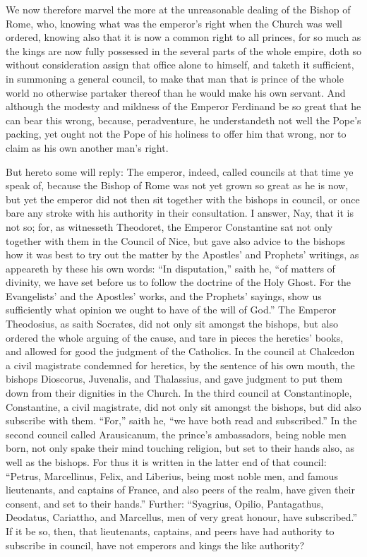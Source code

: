 We now therefore marvel the more at the unreasonable dealing of the
Bishop of Rome, who, knowing what was the emperor’s right when
the Church was well ordered, knowing also that it is now a common right
to all princes, for so much as the kings are now fully possessed in
the several parts of the whole empire, doth so without consideration
assign that office alone to himself, and taketh it sufficient, in summoning
a general council, to make that man that is prince of the whole world
no otherwise partaker thereof than he would make his own servant.
And although the modesty and mildness of the Emperor Ferdinand be so
great that he can bear this wrong, because, peradventure, he understandeth
not well the Pope’s packing, yet ought not the Pope of his holiness
to offer him that wrong, nor to claim as his own another man’s
right.

But hereto some will reply: The emperor, indeed, called
councils at that time ye speak of, because the Bishop of Rome was not
yet grown so great as he is now, but yet the emperor did not then sit
together with the bishops in council, or once bare any stroke with his
authority in their consultation. I answer, Nay, that it is not
so; for, as witnesseth Theodoret, the Emperor Constantine sat not only
together with them in the Council of Nice, but gave also advice to the
bishops how it was best to try out the matter by the Apostles’
and Prophets’ writings, as appeareth by these his own words: “In
disputation,” saith he, “of matters of divinity, we have
set before us to follow the doctrine of the Holy Ghost. For the
Evangelists’ and the Apostles’ works, and the Prophets’
sayings, show us sufficiently what opinion we ought to have of the will
of God.” The Emperor Theodosius, as saith Socrates, did
not only sit amongst the bishops, but also ordered the whole arguing
of the cause, and tare in pieces the heretics’ books, and allowed
for good the judgment of the Catholics. In the council at Chalcedon
a civil magistrate condemned for heretics, by the sentence of his own
mouth, the bishops Dioscorus, Juvenalis, and Thalassius, and gave judgment
to put them down from their dignities in the Church. In the third
council
at Constantinople, Constantine, a civil magistrate, did not only sit
amongst the bishops, but did also subscribe with them. “For,”
saith he, “we have both read and subscribed.” In the
second council called Arausicanum, the prince’s ambassadors, being
noble men born, not only spake their mind touching religion, but set
to their hands also, as well as the bishops. For thus it is written
in the latter end of that council: “Petrus, Marcellinus, Felix,
and Liberius, being most noble men, and famous lieutenants, and captains
of France, and also peers of the realm, have given their consent, and
set to their hands.” Further: “Syagrius, Opilio, Pantagathus,
Deodatus, Cariattho, and Marcellus, men of very great honour, have subscribed.”
If it be so, then, that lieutenants, captains, and peers have had authority
to subscribe in council, have not emperors and kings the like authority?

